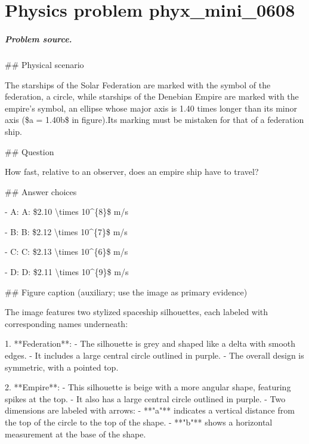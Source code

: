 
\chapter{Physics problem phyx\_mini\_0608}
\label{ch:PhyXMiniProblems_problem_phyx_mini_0608}

\paragraph{Problem source.}
\#\# Physical scenario

The starships of the Solar Federation are marked with the symbol of the federation, a circle, while starships of the Denebian Empire are marked with the empire’s symbol, an ellipse whose major axis is 1.40 times longer than its minor axis (\$a = 1.40b\$ in figure).Its marking must be mistaken for that of a federation ship.

\#\# Question

How fast, relative to an observer, does an empire ship have to travel?

\#\# Answer choices

- A: A: \$2.10 \textbackslash{}times 10\textasciicircum{}\{8\}\$ m/s

- B: B: \$2.12 \textbackslash{}times 10\textasciicircum{}\{7\}\$ m/s

- C: C: \$2.13 \textbackslash{}times 10\textasciicircum{}\{6\}\$ m/s

- D: D: \$2.11 \textbackslash{}times 10\textasciicircum{}\{9\}\$ m/s

\#\# Figure caption (auxiliary; use the image as primary evidence)

The image features two stylized spaceship silhouettes, each labeled with corresponding names underneath:

1. **Federation**: 
   - The silhouette is grey and shaped like a delta with smooth edges.
   - It includes a large central circle outlined in purple.
   - The overall design is symmetric, with a pointed top.

2. **Empire**:
   - This silhouette is beige with a more angular shape, featuring spikes at the top.
   - It also has a large central circle outlined in purple.
   - Two dimensions are labeled with arrows:
     - **"a"** indicates a vertical distance from the top of the circle to the top of the shape.
     - **"b"** shows a horizontal measurement at the base of the shape.

